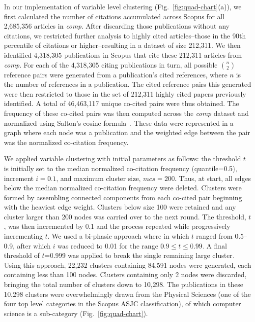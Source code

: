 In our implementation of variable level clustering (Fig.~\ref{fig:quad-chart}(a)), we first calculated the number of citations accumulated across Scopus for all 2,685,356 articles in \emph{comp}. After discarding those publications without any citations, we restricted further analysis to highly cited articles--those in the 90th percentile of citations or higher--resulting in a dataset of size 212,311. We then identified 4,318,305 publications in Scopus that cite these 212,311 articles from \emph{comp}. For each of the 4,318,305 citing publications in turn, all possible ${n \choose 2}$ reference pairs were generated from a publication's cited references, where $n$ is the number of references in a publication. The cited reference pairs this generated were then restricted to those in the set of 212,311 highly cited papers previously identified. A total of 46,463,117 unique co-cited pairs were thus obtained. 
The frequency of these co-cited pairs was then computed across the \emph{comp} dataset  and normalized using Salton's cosine formula~\cite{salton_citation_1979}. These data were represented in a graph where each node was a publication and the weighted edge between the pair was the normalized co-citation frequency. \par 

We applied variable clustering with initial parameters as follows: the threshold  $t$  is initially set to  the median normalized co-citation frequency (quantile=0.5), increment $i = 0.1$, and maximum cluster size, $mcs=200$. Thus, at start, all edges below the median normalized co-citation frequency were deleted. Clusters were formed by assembling connected components from each co-cited pair beginning with the heaviest edge weight. Clusters below size 100 were retained and any cluster larger than 200 nodes was carried over to the next round. The threshold, $t$, was then incremented by 0.1 and the process repeated while progressively incrementing $t$.  We used a bi-phasic approach where in which $t$ ranged from 0.5--0.9, after which $i$ was reduced to 0.01 for the range $0.9 \leq t \leq 0.99$. A final threshold of $t$=0.999 was applied to break the single remaining large cluster.  Using this approach, 22,232 clusters containing 84,591 nodes were generated, each containing less than 100 nodes. Clusters containing only 2 nodes were discarded, bringing the total number of clusters down to 10,298. The publications in these 10,298 clusters were overwhelmingly drawn from the Physical Sciences (one of the four top level categories in the Scopus ASJC classification), of which computer science is a sub-category (Fig.~\ref{fig:quad-chart}).

